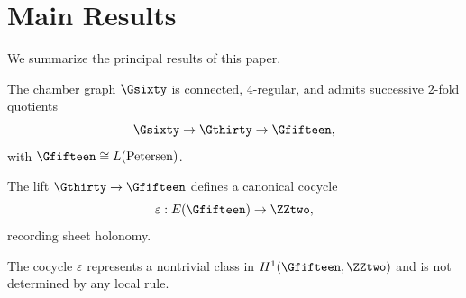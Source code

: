 \section{Main Results}

We summarize the principal results of this paper.

\begin{theorem}
The chamber graph $\Gsixty$ is connected, $4$-regular, and admits
successive $2$-fold quotients
\[
\Gsixty \to \Gthirty \to \Gfifteen,
\]
with $\Gfifteen \cong L(\mathrm{Petersen})$.
\end{theorem}

\begin{theorem}
The lift $\Gthirty \to \Gfifteen$ defines a canonical cocycle
\[
\varepsilon : E(\Gfifteen)\to \ZZtwo,
\]
recording sheet holonomy.
\end{theorem}

\begin{theorem}
The cocycle $\varepsilon$ represents a nontrivial class in
$H^1(\Gfifteen,\ZZtwo)$ and is not determined by any local rule.
\end{theorem}
